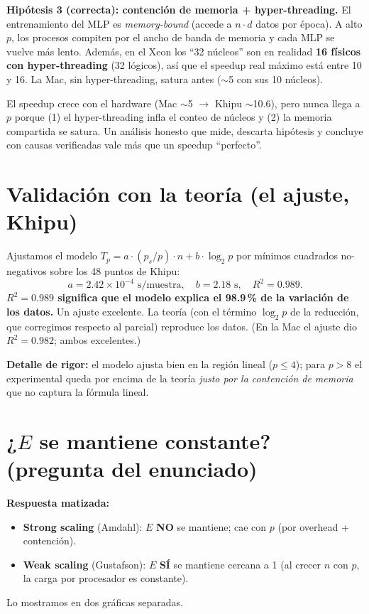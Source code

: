 \documentclass[11pt,a4paper]{article}
\begin{document}
\textbf{Hipótesis 3 (correcta): contención de memoria + hyper-threading.}
El entrenamiento del MLP es \emph{memory-bound} (accede a $n\cdot d$ datos por
época). A alto $p$, los procesos compiten por el ancho de banda de memoria y cada
MLP se vuelve más lento. Además, en el Xeon los ``32 núcleos'' son en realidad
\textbf{16 físicos con hyper-threading} (32 lógicos), así que el speedup real
máximo está entre 10 y 16. La Mac, sin hyper-threading, satura antes ($\sim$5 con
sus 10 núcleos).

\begin{caja}[title=\textbf{La lección clave}]
El speedup crece con el hardware (Mac $\sim$5 $\to$ Khipu $\sim$10.6), pero
nunca llega a $p$ porque (1) el hyper-threading infla el conteo de núcleos y (2)
la memoria compartida se satura. Un análisis honesto que mide, descarta
hipótesis y concluye con causas verificadas vale más que un speedup ``perfecto''.
\end{caja}

\section{Validación con la teoría (el ajuste, Khipu)}

Ajustamos el modelo $T_p = a\cdot(p_s/p)\cdot n + b\cdot\log_2 p$ por mínimos
cuadrados no-negativos sobre los 48 puntos de Khipu:
\[
a=2.42\!\times\!10^{-4}\text{ s/muestra},\quad b=2.18\text{ s},\quad R^2=0.989.
\]
\textbf{$R^2=0.989$ significa que el modelo explica el 98.9\,\% de la variación
de los datos.} Un ajuste excelente. La teoría (con el término $\log_2 p$ de la
reducción, que corregimos respecto al parcial) reproduce los datos. (En la Mac el
ajuste dio $R^2=0.982$; ambos excelentes.)

\textbf{Detalle de rigor:} el modelo ajusta bien en la región lineal ($p\le 4$);
para $p>8$ el experimental queda por encima de la teoría \emph{justo por la
contención de memoria} que no captura la fórmula lineal.

\section{¿$E$ se mantiene constante? (pregunta del enunciado)}

\textbf{Respuesta matizada:}
\begin{itemize}
  \item \textbf{Strong scaling} (Amdahl): $E$ \textbf{NO} se mantiene; cae con
        $p$ (por overhead + contención).
  \item \textbf{Weak scaling} (Gustafson): $E$ \textbf{SÍ} se mantiene cercana a
        1 (al crecer $n$ con $p$, la carga por procesador es constante).
\end{itemize}
Lo mostramos en dos gráficas separadas.
\end{document}
